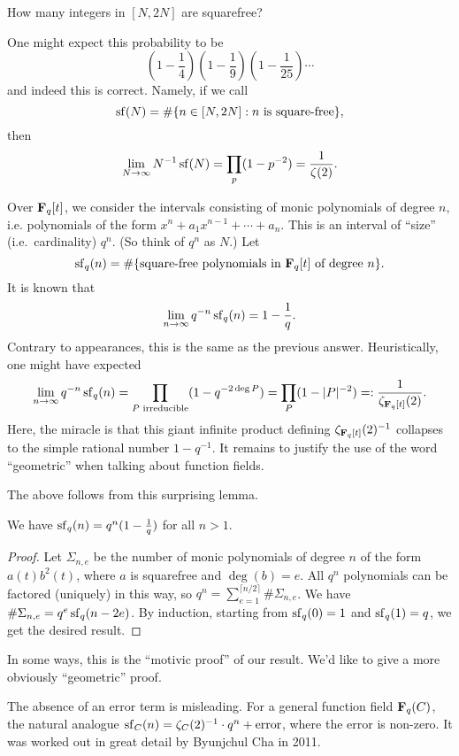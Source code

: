 \begin{question}
How many integers in $[N,2 N]$ are squarefree?
\end{question}

One might expect this probability to be 
\[
  \left(1-\frac 1 4\right)\left(1-\frac 1 9\right)\left(1-\frac{1}{25}\right) \cdots 
\]
and indeed this is correct. Namely, if we call 
\[
  \operatorname{sf}(N) = \#\{n\in [N, 2 N]:n\text{ is square-free}\} ,
\]
then 
\[
  \lim_{N\to \infty} N^{-1} \operatorname{sf}(N) = \prod_p (1-p^{-2}) = \frac{1}{\zeta(2)} .
\]

Over $\mathbf{F}_q[t]$, we consider the intervals consisting of monic polynomials of 
degree $n$, i.e. polynomials of the form 
$x^n+ a_1 x^{n-1} + \cdots + a_n$. This is an interval of ``size'' (i.e.\ 
cardinality) $q^n$. (So think of $q^n$ as $N$.) Let 
\[
  \operatorname{sf}_q(n) = \#\{\text{square-free polynomials in }\mathbf{F}_q[t]\text{ of degree $n$}\} .
\]
It is known that 
\[
  \lim_{n\to \infty} q^{-n} \operatorname{sf}_q(n) = 1 - \frac 1 q .
\]
Contrary to appearances, this is the same as the previous answer. 
Heuristically, one might have expected 
\[
  \lim_{n\to \infty} q^{-n} \operatorname{sf}_q(n) = \prod_{P\text{ irreducible}} (1-q^{-2\deg P}) = \prod_P (1-|P|^{-2}) =: \frac{1}{\zeta_{\mathbf{F}_q[t]}(2)} .
\]
Here, the miracle is that this giant infinite product defining 
$\zeta_{\mathbf{F}_q[t]}(2)^{-1}$ collapses to the simple rational number 
$1-q^{-1}$. It remains to justify the use of the word ``geometric'' when 
talking about function fields. 

The above follows from this surprising lemma. 

\begin{lemma}
We have $\operatorname{sf}_q(n) = q^n(1-\frac 1 q)$ for all $n>1$. 
\end{lemma}
\begin{proof}
Let $\Sigma_{n,e}$ be the number of monic polynomials of degree $n$ of the form 
$a(t) b^2(t)$, where $a$ is squarefree and $\deg(b)=e$. All $q^n$ polynomials 
can be factored (uniquely) in this way, so 
$q^n = \sum_{e=1}^{\lceil n/2\rceil} \# \Sigma_{n,e}$. We have 
$\# \Sigma_{n,e} = q^e \operatorname{sf}_q(n-2 e)$. By induction, starting from 
$\operatorname{sf}_q(0)=1$ and $\operatorname{sf}_q(1)=q$, we get the desired result. 
\end{proof}

In some ways, this is the ``motivic proof'' of our result. We'd like to give a 
more obviously ``geometric'' proof. 

The absence of an error term is misleading. For a general function field 
$\mathbf{F}_q(C)$, the natural analogue 
$\operatorname{sf}_C(n) = \zeta_C(2)^{-1}\cdot q^n + \textnormal{error}$, where the 
error is non-zero. It was worked out in great detail by Byunjchul Cha in 2011. 





